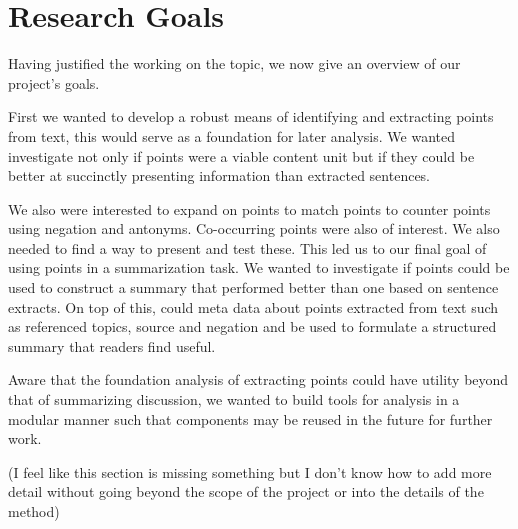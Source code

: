 \chapter{Research Goals\label{chap:res-goals}}
  Having justified the working on the topic, we now give an overview of our project's goals.

  First we wanted to develop a robust means of identifying and extracting points from text, this would serve as a foundation for later analysis. We wanted investigate not only if points were a viable content unit but if they could be better at succinctly presenting information than extracted sentences.

  We also were interested to expand on points to match points to counter points using negation and antonyms. Co-occurring points were also of interest. We also needed to find a way to present and test these. This led us to our final goal of using points in a summarization task. We wanted to investigate if points could be used to construct a summary that performed better than one based on sentence extracts. On top of this, could meta data about points extracted from text such as referenced topics, source and negation and be used to formulate a structured summary that readers find useful.

  Aware that the foundation analysis of extracting points could have utility beyond that of summarizing discussion, we wanted to build tools for analysis in a modular manner such that components may be reused in the future for further work.

  (I feel like this section is missing something but I don't know how to add more detail without going beyond the scope of the project or into the details of the method)
